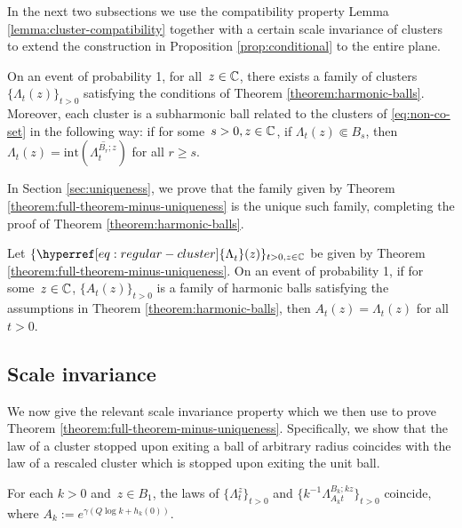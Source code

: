 \documentclass[12pt]{amsart}
\numberwithin{equation}{section}
\newcommand{\cluster}[2]{\hyperref[eq:non-co-set]{\mathit{\Lambda}^{#1}_{#2}}}
\newcommand{\regcluster}[2]{\hyperref[eq:regular-cluster]{\Lambda^{#1}_{#2}}}
\begin{document}
	
	
	
	In the next two subsections we use the compatibility property Lemma \ref{lemma:cluster-compatibility} together with a certain scale invariance of clusters
	to extend the construction in Proposition \ref{prop:conditional} to the entire plane. 
	\begin{theorem} \label{theorem:full-theorem-minus-uniqueness}
		On an event of probability 1, for all~$z \in \mathbb{C}$, there exists a family of clusters $\{{\cluster{}{t}}(z)\}_{t > 0}$ 
		satisfying the conditions of Theorem \ref{theorem:harmonic-balls}. 
		Moreover, each cluster is a subharmonic ball related to the clusters of \eqref{eq:non-co-set} in the following way: 
		if for some~$s > 0, z \in \mathbb{C}$, if ${\regcluster{}{t}(z)} \Subset B_s$, then ${\regcluster{}{t}(z)} = \mathrm{int}(\overline{\cluster{B_r;z}{t}})$ for all $r \geq s$.
	\end{theorem}
	
	In Section \ref{sec:uniqueness}, we prove that the family given by Theorem \ref{theorem:full-theorem-minus-uniqueness} is the unique such family,
	completing the proof of Theorem \ref{theorem:harmonic-balls}. 
	\begin{prop} \label{prop:uniqueness}
		Let $\{{\regcluster{}{t}(z)}\}_{t > 0, z \in \C}$ be given by Theorem \ref{theorem:full-theorem-minus-uniqueness}. 
		On an event of probability 1, if for some~$z \in \mathbb{C}$,  $\{A_t(z)\}_{t > 0}$ is a family 
		of harmonic balls satisfying the assumptions in Theorem \ref{theorem:harmonic-balls}, 
		then $A_t(z)={\regcluster{}{t}(z)}$ for all $t> 0$.
	\end{prop}
	
	
	\subsection{Scale invariance}
	
	
	We now give the relevant scale invariance property which we then use to prove Theorem \ref{theorem:full-theorem-minus-uniqueness}. 
	Specifically, we show that the law of a cluster stopped upon exiting a ball of arbitrary radius coincides with the law of a rescaled cluster which is stopped upon exiting the unit ball. 
	\begin{lemma} \label{lemma:scale-invariance-flow}
		For each $k > 0$ and~$z \in B_1$, the laws of $\{ \cluster{z}{t}\}_{t > 0}$ and $\{ k^{-1} \cluster{B_{k}; k z}{A_k t}\}_{t > 0}$ coincide, where  
		$A_k := e^{\gamma (Q \log k + h_k(0))}$.
	\end{lemma}
	
\end{document}
